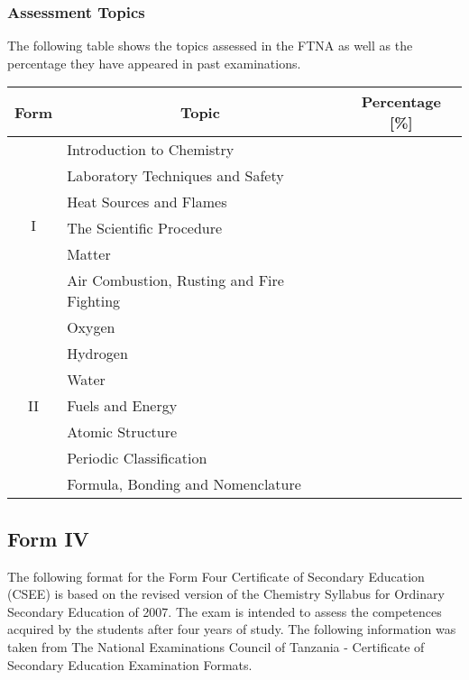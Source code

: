\subsubsection{Assessment Topics}
\noindent The following table shows the topics assessed in the FTNA as well as the percentage they have appeared in past examinations. 
\begin{center}
	\begin{tabular}{|c|l|c|} \hline
		Form & \multicolumn{1}{|c|}{Topic} & Percentage [\%] \\ \hline
		\multirow{6}{*}{I} 	& Introduction to Chemistry				& \\ \cline{2-3}
						& Laboratory Techniques and Safety 		& \\ \cline{2-3}
						& Heat Sources and Flames				& \\ \cline{2-3}
						& The Scientific Procedure				& \\ \cline{2-3}
						& Matter							 	& \\ \cline{2-3}
						& Air Combustion, Rusting and Fire Fighting	& \\ \hline
		\multirow{7}{*}{II} 	& Oxygen			 					& \\ \cline{2-3}
						& Hydrogen					 		& \\ \cline{2-3}
						& Water								& \\ \cline{2-3}
						& Fuels and Energy						& \\ \cline{2-3}
						& Atomic Structure					 	& \\ \cline{2-3}
						& Periodic Classification		 			& \\ \cline{2-3}
						& Formula, Bonding and Nomenclature		& \\ \hline
	\end{tabular}
\end{center}

\subsection{Form IV}
\noindent The following format for the Form Four Certificate of Secondary Education (CSEE) is based on the revised version of the Chemistry Syllabus for Ordinary Secondary Education of 2007. The exam is intended to assess the competences acquired by the students after four years of study. The following information was taken from The National Examinations Council of Tanzania - Certificate of Secondary Education Examination Formats. %

